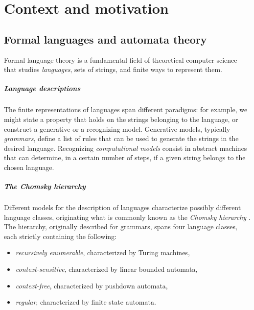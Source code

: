 \chapter{Context and motivation}



\section{Formal languages and automata theory}
Formal language theory is a fundamental field of theoretical computer science that studies \emph{languages}, \ie sets of strings, and finite ways to represent them.

\paragraph{Language descriptions} The finite representations of languages span different paradigms: for example, we might state a property that holds on the strings belonging to the language, or construct a generative or a recognizing model.
Generative models, typically \emph{grammars}, define a list of rules that can be used to generate the strings in the desired language.
Recognizing \emph{computational models} consist in abstract machines that can determine, in a certain number of steps, if a given string belongs to the chosen language.

\paragraph{The Chomsky hierarchy} Different models for the description of languages characterize possibly different language classes, originating what is commonly known as the \emph{Chomsky hierarchy} \cite{Cho56}.
The hierarchy, originally described for grammars, spans four language classes, each strictly containing the following:
\begin{itemize}
	\item \emph{recursively enumerable}, characterized by Turing machines,
	\item \emph{context-sensitive}, characterized by linear bounded automata,
	\item \emph{context-free}, characterized by pushdown automata,
	\item \emph{regular}, characterized by finite state automata.
\end{itemize}

